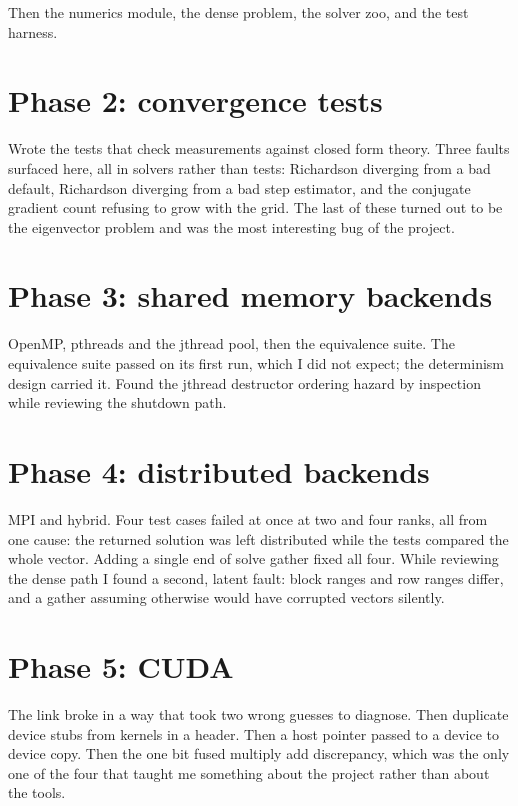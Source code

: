 \documentclass[11pt,a4paper]{report}
\begin{document}
Then the numerics module, the dense problem, the solver zoo, and the test
harness.

\section{Phase 2: convergence tests}

Wrote the tests that check measurements against closed form theory. Three faults
surfaced here, all in solvers rather than tests: Richardson diverging from a bad
default, Richardson diverging from a bad step estimator, and the conjugate
gradient count refusing to grow with the grid. The last of these turned out to be
the eigenvector problem and was the most interesting bug of the project.

\section{Phase 3: shared memory backends}

OpenMP, pthreads and the jthread pool, then the equivalence suite. The
equivalence suite passed on its first run, which I did not expect; the
determinism design carried it. Found the jthread destructor ordering hazard by
inspection while reviewing the shutdown path.

\section{Phase 4: distributed backends}

MPI and hybrid. Four test cases failed at once at two and four ranks, all from
one cause: the returned solution was left distributed while the tests compared
the whole vector. Adding a single end of solve gather fixed all four. While
reviewing the dense path I found a second, latent fault: block ranges and row
ranges differ, and a gather assuming otherwise would have corrupted vectors
silently.

\section{Phase 5: CUDA}

The link broke in a way that took two wrong guesses to diagnose. Then duplicate
device stubs from kernels in a header. Then a host pointer passed to a device to
device copy. Then the one bit fused multiply add discrepancy, which was the only
one of the four that taught me something about the project rather than about the
tools.
\end{document}
